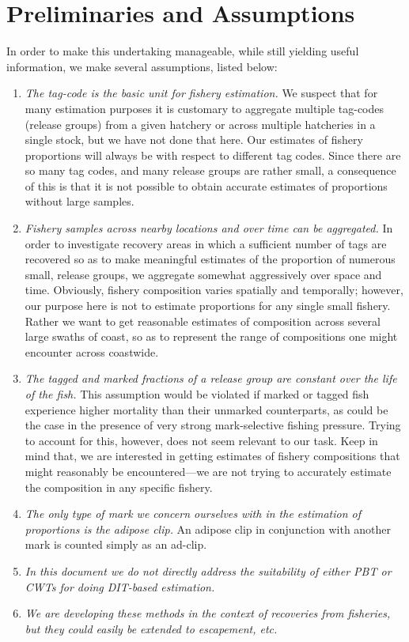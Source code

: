 \documentclass[11pt]{article}
\makeatletter
\newcommand{\etc}{{\em etc.}\@\xspace}
\makeatother
\begin{document}
\section{Preliminaries and Assumptions \label{sec:prelims}}

In order to make this undertaking manageable, while still yielding useful information, we make several
assumptions, listed below:
\begin{enumerate}
\item {\sl The tag-code is the basic unit for fishery estimation.} We suspect that for many estimation purposes
it is customary to aggregate multiple tag-codes (release groups) from a given hatchery or across multiple
hatcheries in a single stock, but we have not done that here.  Our estimates of fishery proportions will
always be with respect to different tag codes.  Since there are so many tag codes, and many release groups
are rather small, a consequence of this is that it is not possible to obtain accurate estimates of proportions
without large samples.
\item {\sl Fishery samples across nearby locations and over time can be aggregated. } In order to investigate
recovery areas in which a sufficient number of tags are recovered so as to make meaningful estimates
of the proportion of numerous small, release groups, we aggregate somewhat aggressively over space and time. 
Obviously, fishery composition varies spatially and temporally; however, our purpose here is not to estimate
proportions for any single small fishery.  Rather we want to get reasonable estimates of composition across
several large swaths of coast, so as to represent the range of compositions one might encounter across
coastwide.  
\item {\sl The tagged and marked fractions of a release group are constant over the life of the fish.}  This
assumption would be violated if marked or tagged fish experience higher mortality than their unmarked
counterparts, as could be the case in the presence of very strong mark-selective fishing pressure.  Trying to
account for this, however, does not seem relevant to our task. Keep in mind that, we are interested in
getting estimates of fishery compositions that might reasonably be encountered---we are not trying to accurately
estimate the composition in any specific fishery.
\item {\sl The only type of mark we concern ourselves with in the estimation of proportions is the
adipose clip.}  An adipose clip in conjunction with another mark is counted simply as an ad-clip.
\item {\sl In this document we do not directly address the suitability of either PBT or CWTs for doing DIT-based estimation.}
\item {\sl We are developing these methods in the context of recoveries from fisheries, but they could easily be
extended to escapement, \etc}
\end{enumerate}
\end{document}
